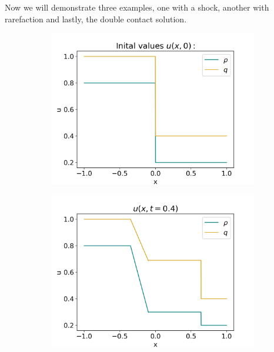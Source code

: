 \documentclass[10pt]{article}
\numberwithin{equation}{section}
\begin{document}
Now we will demonstrate three examples, one with a shock, another with rarefaction and lastly, the double contact solution.
\begin{figure}
     \centering
     \begin{subfigure}[t]{0.35\textwidth}
         \centering
         \includegraphics[width=\textwidth]{Figures/Model/SysRarefacIV.png}
     \end{subfigure}
     \begin{subfigure}[t]{0.35\textwidth}
         \centering
         \includegraphics[width=\textwidth]{Figures/Model/SysRarefacAtTime.png}
     \end{subfigure}
     \hfill
     \begin{subfigure}[b]{0.35\textwidth}

\end{subfigure}
\end{figure}
\end{document}
